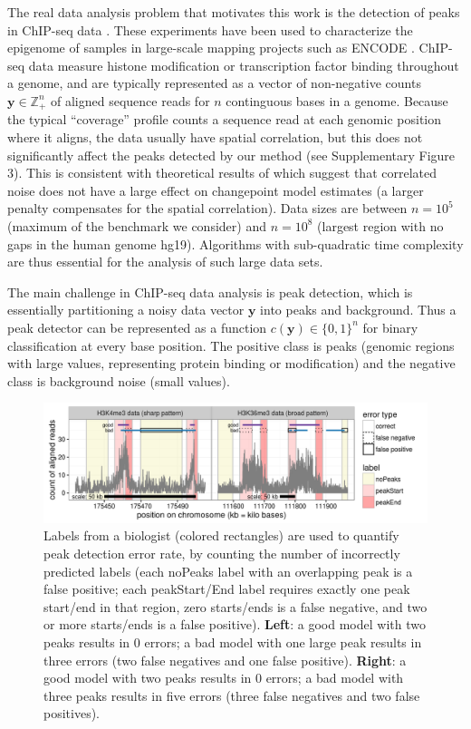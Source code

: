 \documentclass[twoside,11pt]{article}
\newcommand{\ZZ}{\mathbb Z}
\begin{document}
The real data analysis problem that motivates this work is the
detection of peaks in ChIP-seq data \citep{practical}. These
experiments have been used to characterize the epigenome of samples in
large-scale mapping projects such as ENCODE \citep{ENCODE}. ChIP-seq
data measure histone modification or transcription factor binding
throughout a genome, and are typically represented as a vector of
non-negative counts $\mathbf y\in\ZZ_+^n$ of aligned sequence reads
for $n$ continguous bases in a genome. Because the typical
``coverage'' profile counts a sequence read at each genomic position
where it aligns, the data usually have spatial correlation, but this
does not significantly affect the peaks detected by our method (see
Supplementary Figure 3). This is consistent with theoretical results
of \citet{Lavielle-Moulines} which suggest that correlated noise does
not have a large effect on changepoint model estimates (a larger
penalty compensates for the spatial correlation). Data sizes are
between $n=10^5$ (maximum of the benchmark we consider) and $n=10^8$
(largest region with no gaps in the human genome hg19). Algorithms
with sub-quadratic time complexity are thus essential for the analysis
of such large data sets.

The main challenge in ChIP-seq data analysis is peak detection, which
is essentially partitioning a noisy data vector $\mathbf y$ into peaks and
background. Thus a peak detector can be represented as a function
$c(\mathbf y)\in\{0,1\}^n$ for binary classification at every base
position. The positive class is peaks (genomic regions with large
values, representing protein binding or modification) and the negative
class is background noise (small values).

\begin{figure}[t!]
  \centering
  \includegraphics[width=\textwidth]{figure-good-bad}
\vskip -0.5cm
\caption{Labels from a biologist (colored rectangles) are used to 
  quantify peak detection error rate, by counting the
  number of incorrectly predicted labels
  (each noPeaks label with an overlapping
  peak is a false positive; each peakStart/End label requires exactly
  one peak start/end in that region, zero starts/ends is a false
  negative, and two or more starts/ends is a false positive).
  \textbf{Left}: a \textcolor{good}{good} model with two peaks results in 0 errors; a
  \textcolor{bad}{bad} model with one large peak results in three errors (two false negatives and one false positive).
  \textbf{Right}: a \textcolor{good}{good} model with two peaks results in 0 errors; a
  \textcolor{bad}{bad} model with three peaks results in five errors (three false negatives and two false positives).
}
  \label{fig:good-bad}
\end{figure}
\end{document}
